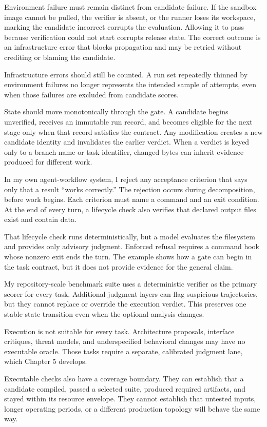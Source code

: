 Environment failure must remain distinct from candidate failure. If the sandbox image cannot be pulled, the verifier is absent, or the runner loses its workspace, marking the candidate incorrect corrupts the evaluation. Allowing it to pass because verification could not start corrupts release state. The correct outcome is an infrastructure error that blocks propagation and may be retried without crediting or blaming the candidate.

Infrastructure errors should still be counted. A run set repeatedly thinned by environment failures no longer represents the intended sample of attempts, even when those failures are excluded from candidate scores.

State should move monotonically through the gate. A candidate begins unverified, receives an immutable run record, and becomes eligible for the next stage only when that record satisfies the contract. Any modification creates a new candidate identity and invalidates the earlier verdict. When a verdict is keyed only to a branch name or task identifier, changed bytes can inherit evidence produced for different work.

In my own agent-workflow system, I reject any acceptance criterion that says only that a result ``works correctly.'' The rejection occurs during decomposition, before work begins. Each criterion must name a command and an exit condition. At the end of every turn, a lifecycle check also verifies that declared output files exist and contain data.

That lifecycle check runs deterministically, but a model evaluates the filesystem and provides only advisory judgment. Enforced refusal requires a command hook whose nonzero exit ends the turn. The example shows how a gate can begin in the task contract, but it does not provide evidence for the general claim.

My repository-scale benchmark suite uses a deterministic verifier as the primary scorer for every task. Additional judgment layers can flag suspicious trajectories, but they cannot replace or override the execution verdict. This preserves one stable state transition even when the optional analysis changes.

Execution is not suitable for every task. Architecture proposals, interface critiques, threat models, and underspecified behavioral changes may have no executable oracle. Those tasks require a separate, calibrated judgment lane, which Chapter 5 develops.

Executable checks also have a coverage boundary. They can establish that a candidate compiled, passed a selected suite, produced required artifacts, and stayed within its resource envelope. They cannot establish that untested inputs, longer operating periods, or a different production topology will behave the same way.

